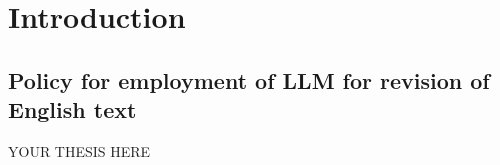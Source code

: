 \chapter{Introduction}
\section*{Policy for employment of LLM for revision of English text}


YOUR THESIS HERE~\cite{wielemaker2012swi, swi}